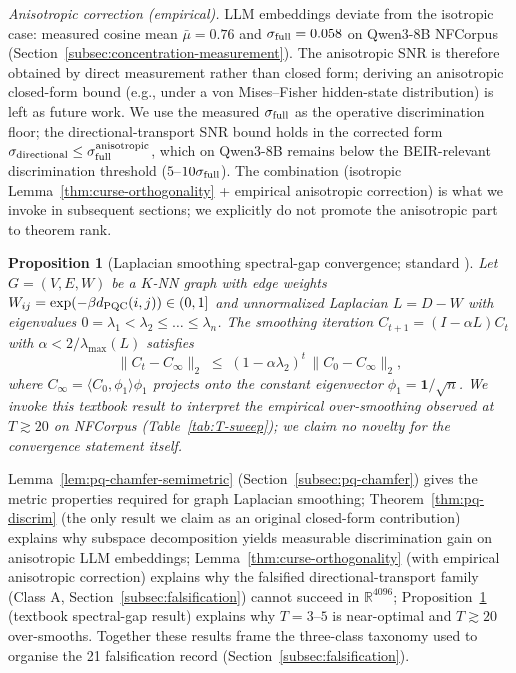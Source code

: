 \documentclass[review,1p]{elsarticle}
\newtheorem{proposition}{Proposition}
\newcommand{\R}{\mathbb{R}}
\begin{document}
\noindent\emph{Anisotropic correction (empirical).} LLM embeddings deviate from the isotropic case: measured cosine mean $\bar{\mu} = 0.76$ and $\sigma_{\rm full} = 0.058$ on Qwen3-8B NFCorpus (Section~\ref{subsec:concentration-measurement}). The anisotropic SNR is therefore obtained by direct measurement rather than closed form; deriving an anisotropic closed-form bound (e.g., under a von Mises--Fisher hidden-state distribution) is left as future work. We use the measured $\sigma_{\rm full}$ as the operative discrimination floor; the directional-transport SNR bound holds in the corrected form $\sigma_{\rm directional} \le \sigma_{\rm full}^{\rm anisotropic}$, which on Qwen3-8B remains below the BEIR-relevant discrimination threshold ($5$--$10\sigma_{\rm full}$). The combination (isotropic Lemma~\ref{thm:curse-orthogonality} + empirical anisotropic correction) is what we invoke in subsequent sections; we explicitly do not promote the anisotropic part to theorem rank.

\begin{proposition}[Laplacian smoothing spectral-gap convergence; standard \citep{shuman2013spm}]
\label{thm:laplacian-cluster}
Let $G = (V, E, W)$ be a $K$-NN graph with edge weights $W_{ij} = \exp(-\beta d_{\rm PQC}(i,j)) \in (0, 1]$ and unnormalized Laplacian $L = D - W$ with eigenvalues $0 = \lambda_1 < \lambda_2 \le \ldots \le \lambda_n$. The smoothing iteration $C_{t+1} = (I - \alpha L)C_t$ with $\alpha < 2/\lambda_{\max}(L)$ satisfies
\begin{equation}
\label{eq:laplacian-convergence}
\| C_t - C_\infty \|_2 \;\le\; (1 - \alpha\lambda_2)^t \, \| C_0 - C_\infty \|_2,
\end{equation}
where $C_\infty = \langle C_0, \phi_1\rangle\phi_1$ projects onto the constant eigenvector $\phi_1 = \mathbf{1}/\sqrt{n}$. We invoke this textbook result \citep{shuman2013spm} to interpret the empirical over-smoothing observed at $T \gtrsim 20$ on NFCorpus (Table~\ref{tab:T-sweep}); we claim no novelty for the convergence statement itself.
\end{proposition}

Lemma~\ref{lem:pq-chamfer-semimetric} (Section~\ref{subsec:pq-chamfer}) gives the metric properties required for graph Laplacian smoothing; Theorem~\ref{thm:pq-discrim} (the only result we claim as an original closed-form contribution) explains why subspace decomposition yields measurable discrimination gain on anisotropic LLM embeddings; Lemma~\ref{thm:curse-orthogonality} (with empirical anisotropic correction) explains why the falsified directional-transport family (Class A, Section~\ref{subsec:falsification}) cannot succeed in $\R^{4096}$; Proposition~\ref{thm:laplacian-cluster} (textbook spectral-gap result) explains why $T=3$--$5$ is near-optimal and $T \gtrsim 20$ over-smooths. Together these results frame the three-class taxonomy used to organise the 21 falsification record (Section~\ref{subsec:falsification}).
\end{document}
